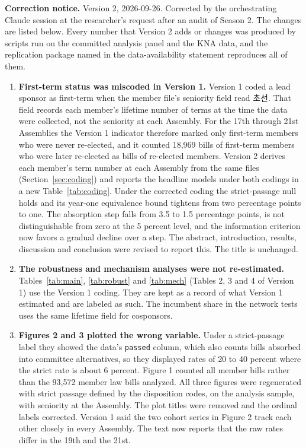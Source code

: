 \documentclass[11pt]{article}
\begin{document}
{\small
\noindent\textbf{Correction notice.} Version 2, 2026-09-26. Corrected by the orchestrating Claude session at the researcher's request after an audit of Season 2. The changes are listed below. Every number that Version 2 adds or changes was produced by scripts run on the committed analysis panel and the KNA data, and the replication package named in the data-availability statement reproduces all of them.

\begin{enumerate}
\setlength{\itemsep}{1pt}
\item \textbf{First-term status was miscoded in Version 1.} Version 1 coded a lead sponsor as first-term when the member file's seniority field read 초선. That field records each member's lifetime number of terms at the time the data were collected, not the seniority at each Assembly. For the 17th through 21st Assemblies the Version 1 indicator therefore marked only first-term members who were never re-elected, and it counted 18,969 bills of first-term members who were later re-elected as bills of re-elected members. Version 2 derives each member's term number at each Assembly from the same files (Section~\ref{sec:coding}) and reports the headline models under both codings in a new Table~\ref{tab:coding}. Under the corrected coding the strict-passage null holds and its year-one equivalence bound tightens from two percentage points to one. The absorption step falls from 3.5 to 1.5 percentage points, is not distinguishable from zero at the 5 percent level, and the information criterion now favors a gradual decline over a step. The abstract, introduction, results, discussion and conclusion were revised to report this. The title is unchanged.
\item \textbf{The robustness and mechanism analyses were not re-estimated.} Tables~\ref{tab:main}, \ref{tab:robust} and \ref{tab:mech} (Tables 2, 3 and 4 of Version 1) use the Version 1 coding. They are kept as a record of what Version 1 estimated and are labeled as such. The incumbent share in the network tests uses the same lifetime field for cosponsors.
\item \textbf{Figures 2 and 3 plotted the wrong variable.} Under a strict-passage label they showed the data's \texttt{passed} column, which also counts bills absorbed into committee alternatives, so they displayed rates of 20 to 40 percent where the strict rate is about 6 percent. Figure 1 counted all member bills rather than the 93,572 member law bills analyzed. All three figures were regenerated with strict passage defined by the disposition codes, on the analysis sample, with seniority at the Assembly. The plot titles were removed and the ordinal labels corrected. Version 1 said the two cohort series in Figure 2 track each other closely in every Assembly. The text now reports that the raw rates differ in the 19th and the 21st.

\end{enumerate}}
\end{document}
